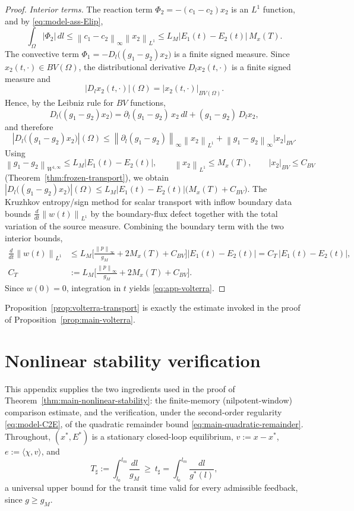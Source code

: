 \documentclass[pdflatex,sn-mathphys-num]{sn-jnl}
\theoremstyle{thmstyleone}
\theoremstyle{definition}
\theoremstyle{remark}
\newcommand{\Om}{\Omega}
\newcommand{\norm}[1]{\left\lVert#1\right\rVert}
\newcommand{\abs}[1]{\left\lvert#1\right\rvert}
\numberwithin{equation}{section}
\begin{document}
\begin{proof}
\emph{Interior terms.} The reaction term $\Phi_2=-(c_1-c_2)x_2$ is an $L^1$
function, and by \eqref{eq:model-ass-Elip},
\[
\int_\Om\abs{\Phi_2}\,dl
\le\norm{c_1-c_2}_\infty\norm{x_2}_{L^1}
\le L_M\abs{E_1(t)-E_2(t)}\,M_x(T).
\]
The convective term $\Phi_1=-D_l\big((g_1-g_2)x_2\big)$ is a finite signed
measure. Since $x_2(t,\cdot)\in BV(\Om)$, the distributional derivative
$D_lx_2(t,\cdot)$ is a finite signed measure and
\[
\abs{D_lx_2(t,\cdot)}(\Om)=\abs{x_2(t,\cdot)}_{BV(\Om)}.
\]
Hence, by the Leibniz rule for $BV$ functions,
\[
D_l\big((g_1-g_2)x_2\big)
=
\partial_l(g_1-g_2)\,x_2\,dl
+
(g_1-g_2)\,D_lx_2 ,
\]
and therefore
\[
\abs{D_l\big((g_1-g_2)x_2\big)}(\Om)
\le
\norm{\partial_l(g_1-g_2)}_\infty\norm{x_2}_{L^1}
+
\norm{g_1-g_2}_\infty\abs{x_2}_{BV}.
\]
Using
\[
\norm{g_1-g_2}_{W^{1,\infty}}
\le
L_M\abs{E_1(t)-E_2(t)},
\qquad
\norm{x_2}_{L^1}\le M_x(T),
\qquad
\abs{x_2}_{BV}\le C_{BV}
\]
(Theorem~\ref{thm:frozen-transport}), we obtain
$\displaystyle 
\abs{D_l\big((g_1-g_2)x_2\big)}(\Om)
\le
L_M\abs{E_1(t)-E_2(t)}\big(M_x(T)+C_{BV}\big)$.
The Kruzhkov entropy/sign method for scalar transport with inflow boundary data
\cite{bardos1979first,kruvzkov1970first} bounds
$\tfrac{d}{dt}\norm{w(t)}_{L^1}$ by the boundary-flux defect together with the
total variation of the source measure. Combining the boundary term with the two
interior bounds,
\begin{equation*}
\begin{aligned}
\frac{d}{dt}\norm{w(t)}_{L^1}
&\le
L_M\Big[\tfrac{\norm{p}_\infty}{g_M}+2M_x(T)+C_{BV}\Big]
\abs{E_1(t)-E_2(t)}
=C_T\,\abs{E_1(t)-E_2(t)}, \\
C_T&:=L_M\Big[\tfrac{\norm{p}_\infty}{g_M}+2M_x(T)+C_{BV}\Big].
\end{aligned}
\end{equation*}
Since $w(0)=0$, integration in $t$ yields \eqref{eq:app-volterra}.
\end{proof}

Proposition~\ref{prop:volterra-transport} is exactly the estimate invoked in the
proof of Proposition~\ref{prop:main-volterra}.
\section{Nonlinear stability verification}
\label{app:nonlinear}
This appendix supplies the two ingredients used in the proof of
Theorem~\ref{thm:main-nonlinear-stability}: the finite-memory (nilpotent-window)
comparison estimate, and the verification, under the second-order regularity
\eqref{eq:model-C2E}, of the quadratic remainder bound
\eqref{eq:main-quadratic-remainder}. Throughout, $(x^*,E^*)$ is a stationary
closed-loop equilibrium, $v:=x-x^*$, $e:=\langle\chi,v\rangle$, and
\begin{equation}
\label{eq:app-Tsharp}
T_\sharp:=\int_{l_0}^{l_m}\frac{dl}{g_M}\ \ge\ t_\sharp
=\int_{l_0}^{l_m}\frac{dl}{g^*(l)},
\end{equation}
a universal upper bound for the transit time valid for every admissible feedback,
since $g\ge g_M$.
\end{document}
